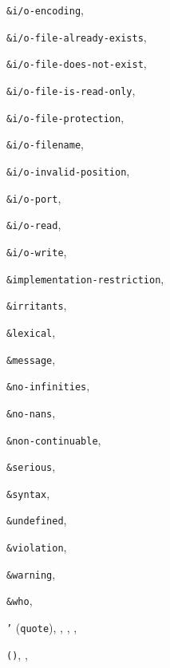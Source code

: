 {\begin{multicols}{2}
\texttt{\&{}i/o-encoding}, \textit{\pageref{exceptions_s43}}
  
\texttt{\&{}i/o-file-already-exists}, \textit{\pageref{exceptions_s39}}
  
\texttt{\&{}i/o-file-does-not-exist}, \textit{\pageref{exceptions_s40}}
  
\texttt{\&{}i/o-file-is-read-only}, \textit{\pageref{exceptions_s38}}
  
\texttt{\&{}i/o-file-protection}, \textit{\pageref{exceptions_s37}}
  
\texttt{\&{}i/o-filename}, \textit{\pageref{exceptions_s36}}
  
\texttt{\&{}i/o-invalid-position}, \textit{\pageref{exceptions_s35}}
  
\texttt{\&{}i/o-port}, \textit{\pageref{exceptions_s41}}
  
\texttt{\&{}i/o-read}, \textit{\pageref{exceptions_s33}}
  
\texttt{\&{}i/o-write}, \textit{\pageref{exceptions_s34}}
  
\texttt{\&{}implementation-restriction}, \textit{\pageref{exceptions_s28}}
  
\texttt{\&{}irritants}, \textit{\pageref{exceptions_s25}}
  
\texttt{\&{}lexical}, \textit{\pageref{exceptions_s29}}
  
\texttt{\&{}message}, \textit{\pageref{exceptions_s24}}
  
\texttt{\&{}no-infinities}, \textit{\pageref{exceptions_s44}}
  
\texttt{\&{}no-nans}, \textit{\pageref{exceptions_s45}}
  
\texttt{\&{}non-continuable}, \textit{\pageref{exceptions_s27}}
  
\texttt{\&{}serious}, \textit{\pageref{exceptions_s19}}
  
\texttt{\&{}syntax}, \textit{\pageref{exceptions_s30}}
  
\texttt{\&{}undefined}, \textit{\pageref{exceptions_s31}}
  
\texttt{\&{}violation}, \textit{\pageref{exceptions_s20}}
  
\texttt{\&{}warning}, \textit{\pageref{exceptions_s23}}
  
\texttt{\&{}who}, \textit{\pageref{exceptions_s26}}
  
\texttt{'} (\texttt{quote}), \pageref{start_s15}, \pageref{start_s44}, \pageref{further_s4}, \textit{\pageref{objects_s2}}
  
\texttt{()}, \pageref{intro_s33}, \pageref{start_s23}
  

\end{multicols}}
